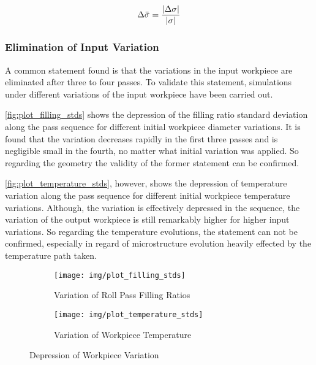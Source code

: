 \begin{equation}
    {\Delta\bar{\sigma}} = \frac{{\lvert {\Delta {\sigma}} \rvert}}{{\lvert {\sigma} \rvert}}
    \label{eq:relative-variation-depression}
\end{equation}


\subsubsection{Elimination of Input Variation}\label{subsubsec:elimination-of-input-variation}

A common statement found is that the variations in the input workpiece are eliminated after three to four passes.
To validate this statement, simulations under different variations of the input workpiece have been carried out.

\autoref{fig:plot_filling_stds} shows the depression of the filling ratio standard deviation along the pass sequence for different initial workpiece diameter variations.
It is found that the variation decreases rapidly in the first three passes and is negligible small in the fourth, no matter what initial variation was applied.
So regarding the geometry the validity of the former statement can be confirmed.

\autoref{fig:plot_temperature_stds}, however, shows the depression of temperature variation along the pass sequence for different initial workpiece temperature variations.
Although, the variation is effectively depressed in the sequence, the variation of the output workpiece is still remarkably higher for higher input variations.
So regarding the temperature evolutions, the statement can not be confirmed, especially in regard of microstructure evolution heavily effected by the temperature path taken.

\begin{figure}
    \begin{subfigure}{\linewidth}
        \centering
        \texttt{[image: img/plot\_filling\_stds]}
        \caption{Variation of Roll Pass Filling Ratios}
        \label{fig:plot_filling_stds}
    \end{subfigure}
    \begin{subfigure}{\linewidth}
        \centering
        \texttt{[image: img/plot\_temperature\_stds]}
        \caption{Variation of Workpiece Temperature}
        \label{fig:plot_temperature_stds}
    \end{subfigure}
    \caption{Depression of Workpiece Variation}
\end{figure}

